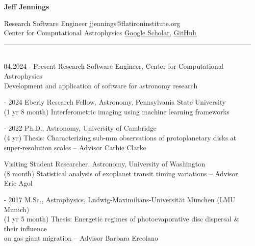 \documentclass[10pt,preprint]{aastex}
\newcommand*{\xdash}[1][3em]{\rule[0.5ex]{#1}{0.7pt}}
\begin{document}
\begin{center}
{\bf{\large Jeff Jennings}}
\end{center}
Research Software Engineer \hfill
\hfill jjennings@flatironinstitute.org\\
Center for Computational Astrophysics \hfill
\hfill \href{http://bit.ly/jennings_googlescholar}{Google Scholar}, \href{http://github.com/jeffjennings}{GitHub}

 \xdash[69ex] \\ %
04.2024 - Present \-\hspace{1.3cm} Research Software Engineer, Center for Computational Astrophysics \\
\-\hspace{4.51cm}Development and application of software for astronomy research

 - 2024 \-\hspace{2.2cm} Eberly Research Fellow, Astronomy, Pennsylvania State University \\
(1 yr 8 month) \-\hspace{2.1cm}Interferometric imaging using machine learning frameworks

 - 2022 \-\hspace{2.2cm} Ph.D., Astronomy, University of Cambridge \\
(4 yr) \-\hspace{3.5cm}Thesis: Characterizing sub-mm observations of protoplanetary disks at \\
\-\hspace{4.4cm} super-resolution scales -- Advisor Cathie Clarke

 \-\hspace{3.25cm} Visiting Student Researcher, Astronomy, University of Washington\\
(8 month) \-\hspace{2.85cm}Statistical analysis of exoplanet transit timing variations -- Advisor Eric Agol

 - 2017 \-\hspace{2.2cm} M.Sc., Astrophysics, Ludwig-Maximilians-Universit{\"a}t M{\"u}nchen (LMU Munich)\\
(1 yr 5 month) \-\hspace{2.1cm}Thesis: Energetic regimes of photoevaporative disc dispersal \& their influence \\
\-\hspace{4.55cm}on gas giant migration -- Advisor Barbara Ercolano
\end{document}

